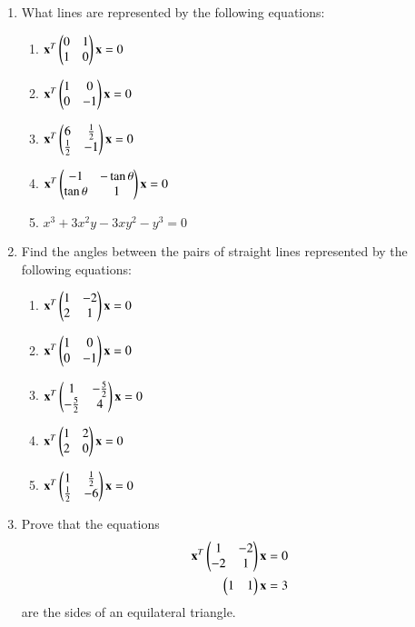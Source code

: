 \renewcommand{\theequation}{\theenumi}
\begin{enumerate}[label=\arabic*.,ref=\thesubsection.\theenumi]
\item What lines are represented by the following equations:
\begin{multicols}{2}
\begin{enumerate}
\item 
$
\mathbf{x}^T
\begin{pmatrix}0 & 1\\1 & 0\end{pmatrix}
\mathbf{x} = 0
$
\item 
$
\mathbf{x}^T
\begin{pmatrix}1 & 0\\0 & -1\end{pmatrix}
\mathbf{x} = 0
$
\item 
$
\mathbf{x}^T
\begin{pmatrix}6 & \frac{1}{2}\\\frac{1}{2} & -1\end{pmatrix}
\mathbf{x} = 0
$
\item 
$
\mathbf{x}^T
\begin{pmatrix}-1 & -\tan\theta\\\-\tan\theta & 1\end{pmatrix}
\mathbf{x} = 0
$
\item 
$
x^3+3x^2y-3xy^2-y^3 = 0
$
\end{enumerate}
\end{multicols}
\item Find the angles between the pairs of straight lines represented by the following equations:
\begin{multicols}{2}
\begin{enumerate}
\item
$
\mathbf{x}^T
\begin{pmatrix}1 & -2\\\-2 & 1\end{pmatrix}
\mathbf{x} = 0
$
\item
$
\mathbf{x}^T
\begin{pmatrix}1 & 0\\0 & -1\end{pmatrix}
\mathbf{x} = 0
$
\item
$
\mathbf{x}^T
\begin{pmatrix}1 & -\frac{5}{2}\\-\frac{5}{2} & 4\end{pmatrix}
\mathbf{x} = 0
$
\item
$
\mathbf{x}^T
\begin{pmatrix}1 & 2\\2 & 0\end{pmatrix}
\mathbf{x} = 0
$
\item
$
\mathbf{x}^T
\begin{pmatrix}1 & \frac{1}{2}\\ \frac{1}{2} & -6\end{pmatrix}
\mathbf{x} = 0
$
\end{enumerate}
\end{multicols}
\item Prove that the equations
\begin{align}
\mathbf{x}^T
\begin{pmatrix}1 & -2\\-2 & 1\end{pmatrix}
\mathbf{x} = 0
\\
\begin{pmatrix}1 & 1\end{pmatrix}\mathbf{x} = 3
\end{align}
are the sides of an equilateral triangle.
\end{enumerate}
